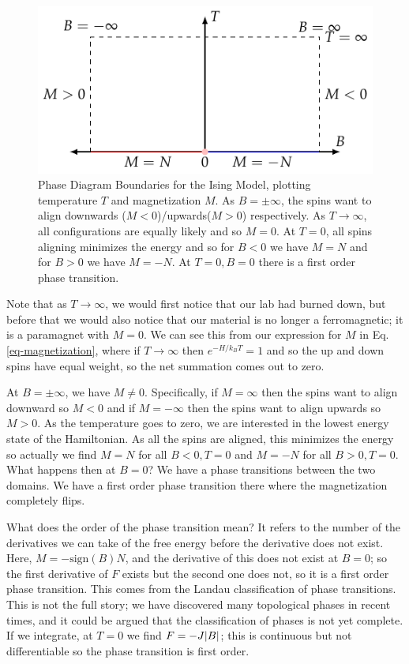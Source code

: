 \begin{figure}[htbp]
    \centering
    \includegraphics{Images/fig-Isingphasediagramboundaries.pdf}
    
    \caption{Phase Diagram Boundaries for the Ising Model, plotting temperature $T$ and magnetization $M$. As $B = \pm \infty$, the spins want to align downwards ($M < 0$)/upwards($M > 0$) respectively. As $T \to \infty$, all configurations are equally likely and so $M = 0$. At $T = 0$, all spins aligning minimizes the energy and so for $B < 0$ we have $M = N$ and for $B > 0$ we have $M = -N$. At $T = 0, B = 0$ there is a first order phase transition.}
    \label{fig-Isingphasediagramboundaries}
\end{figure}

Note that as $T \to \infty$, we would first notice that our lab had burned down, but before that we would also notice that our material is no longer a ferromagnetic; it is a paramagnet with $M = 0$. We can see this from our expression for $M$ in Eq. \eqref{eq-magnetization}, where if $T \to \infty$ then $e^{-H/k_B T} = 1$ and so the up and down spins have equal weight, so the net summation comes out to zero.

At $B = \pm \infty$, we have $M \neq 0$. Specifically, if $M = \infty$ then the spins want to align downward so $M < 0$ and if $M = -\infty$ then the spins want to align upwards so $M > 0$. As the temperature goes to zero, we are interested in the lowest energy state of the Hamiltonian. As all the spins are aligned, this minimizes the energy so actually we find $M = N$ for all $B < 0, T = 0$ and $M = -N$ for all $B > 0, T = 0$. What happens then at $B = 0$? We have a phase transitions between the two domains. We have a first order phase transition there where the magnetization completely flips.

What does the order of the phase transition mean? It refers to the number of the derivatives we can take of the free energy before the derivative does not exist. Here, $M = -\text{sign}(B) N$, and the derivative of this does not exist at $B = 0$; so the first derivative of $F$ exists but the second one does not, so it is a first order phase transition. This comes from the Landau classification of phase transitions. This is not the full story; we have discovered many topological phases in recent times, and it could be argued that the classification of phases is not yet complete. If we integrate, at $T = 0$ we find $F = -J\lvert B \rvert$; this is continuous but not differentiable so the phase transition is first order.

